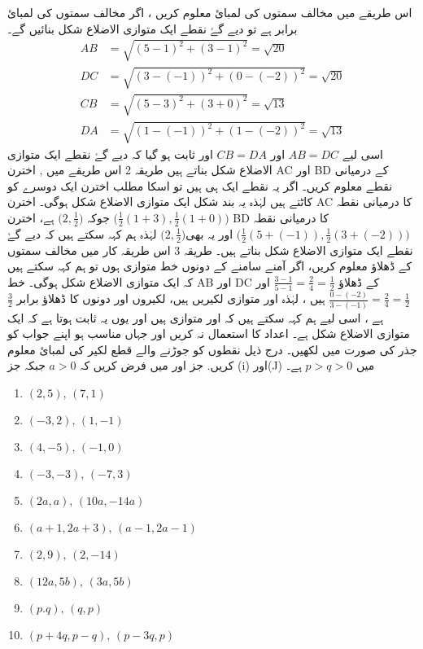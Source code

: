  اس طریقے میں مخالف سمتوں کی لمبائ معلوم کریں ، اگر مخالف سمتوں کی لمبائ برابر ہے تو دیے گۓ نقطے ایک متوازی الاضلاع شکل بنائیں گے۔
\begin{align*}
AB &= \sqrt{(5-1)^2 + (3-1)^2} = \sqrt{20} \\ DC &= \sqrt{(3-(-1))^2 + (0-(-2))^2} = \sqrt{20} \\ CB &= \sqrt{(5-3)^{2} + (3+0)^{2}} = \sqrt{13} \\ DA &= \sqrt{(1-(-1))^2 + (1-(-2))^2} = \sqrt{13} 
\end{align*}
اسی لیے \( AB = DC \)  اور   \( CB = DA \) اور ثابت ہو گیا کہ دیے گۓ نقطے ایک متوازی الاضلاع شکل بناتے ہیں
طریقہ 2 
اس طریقے میں , اخترن    AC  اور     BD   کے درمیانی نقطے معلوم کریں۔ اگر یہ نقطے ایک ہی ہیں تو اسکا مطلب اخترن ایک دوسرے کو کاٹتے ہیں  لہٰذہ یہ بند شکل ایک متوازی الاضلاع شکل ہوگی۔
اخترن  AC کا درمیانی نقطہ \( \big( \frac{1}{2}(1+3),\frac{1}{2}(1+0)\big)  \) جوکہ \(  \big( 2, \frac{1}{2}\big)\) ہے، اخترن  BD کا  درمیانی نقطہ \(    \big( \frac{1}{2}(5+(-1)) , \frac{1}{2}(3+(-2))     \big) \) اور یہ بھی\(  \big( 2, \frac{1}{2}\big)\) لہٰذہ ہم کہہ سکتے ہیں کہ دیے گۓ نقطے ایک متوازی الاضلاع شکل بناتے ہیں۔
طریقہ 3 
اس طریقہ کار میں مخالف سمتوں کے ڈھلاؤ معلوم کریں، اگر آمنے سامنے کے دونوں خط متوازی ہوں تو ہم کہہ سکتے ہیں کہ    ایک متوازی الاضلاع شکل ہوگی۔ خط AB  اور  DC  کے ڈھلاؤ \(  \frac{3-1}{5-1}=\frac{2}{4}=\frac{1}{2}        \) اور \( \frac{0-(-2)}{3-(-1)}=\frac{2}{4}=\frac{1}{2}  \)  ہیں ، لہٰذہ   اور  متوازی لکیریں ہیں، لکیروں      اور      دونوں کا ڈھلاؤ  برابر  \(  \frac{3}{2}\)  ہے ، اسی لیے ہم کہہ سکتے ہیں کہ     اور     متوازی ہیں اور یوں یہ ثابت ہوتا ہے کہ    ایک متوازی الاضلاع شکل ہے۔
اعداد کا استعمال نہ کریں اور جہاں مناسب ہو اپنے جواب کو جذر کی صورت میں لکھیں۔
درج ذیل نقطوں کو جوڑنے والے قطع لکیر کی لمبائ معلوم کریں. جز   اور  میں فرض کریں کہ    \(a> 0\)  جبکہ جز   (i)    اور(J) میں      \( p>q > 0   \)   ہے۔
\begin{multicols}{2}
\begin{enumerate}[.a]
\item \( (2,5), \,  (7,1)  \) 
\item \( (-3,2), \,  (1,-1) \)
\item \( (4,-5), \,  (-1,0) \)
\item \( (-3,-3), \,  (-7,3) \)
\item \( (2a,a), \,  (10a, -14a) \)
\item \( (a+1, 2a+3), \,  (a-1, 2a-1) \)
\item \( (2,9), \,  (2,-14) \)
\item \( (12a,5b), \,  (3a,5b) \)
\item \( (p.q), \,  (q,p) \) 
\item \( (p+4q, p-q), \,  (p-3q,p) \)
\end{enumerate}
\end{multicols}
